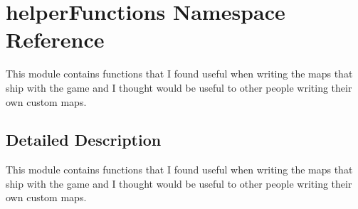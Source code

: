 \hypertarget{namespacehelper_functions}{}\section{helper\+Functions Namespace Reference}
\label{namespacehelper_functions}


This module contains functions that I found useful when writing the maps that ship with the game and I thought would be useful to other people writing their own custom maps.  




\subsection{Detailed Description}
This module contains functions that I found useful when writing the maps that ship with the game and I thought would be useful to other people writing their own custom maps. 